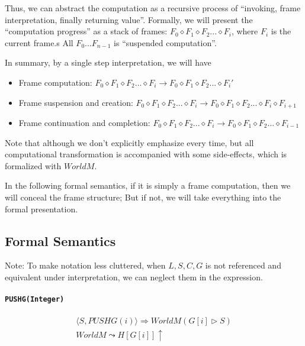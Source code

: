 \documentclass[]{article}
\numberwithin{equation}{section}
\numberwithin{figure}{section}
\numberwithin{table}{section}
\begin{document}
Thus, we can abstract the computation as a recursive process of
``invoking, frame interpretation, finally returning value''. Formally, we will present the ``computation progress'' as a stack
of frames: $F_0 \diamond F_1 \diamond F_2 ... \diamond F_i$, where $F_i$
is the current frame.s All $F_0 ... F_{n - 1}$ is ``suspended
computation''.

In summary, by a single step interpretation, we will have

\begin{itemize}
\itemsep1pt\parskip0pt
\item
  Frame computation:
  $F_0 \diamond F_1 \diamond F_2 ... \diamond F_i \rightarrow F_0 \diamond F_1 \diamond F_2 ... \diamond F_i'$
\item
  Frame suspension and creation:
  $F_0 \diamond F_1 \diamond F_2 ... \diamond F_i \rightarrow F_0 \diamond F_1 \diamond F_2 ... \diamond F_i \diamond F_{i + 1}$
\item
  Frame continuation and completion:
  $F_0 \diamond F_1 \diamond F_2 ... \diamond F_i \rightarrow F_0 \diamond F_1 \diamond F_2 ... \diamond F_{i - 1}$
\end{itemize}

Note that although we don't explicitly emphasize every time,
but all computational transformation is accompanied with some side-effects,
which is formalized with $WorldM$.

In the following formal semantics, if it is simply a frame computation,
then we will conceal the frame structure; But if not, we will take
everything into the formal presentation.

\subsection{Formal Semantics}\label{formal-semantics}

Note: To make notation less cluttered, when $L, S, C, G$ is not referenced
and equivalent under interpretation, we can neglect them in the
expression.

\paragraph{\texttt{PUSHG(Integer)}}\label{pushginteger}

\begin{gather*}
  \langle S, PUSHG(i)\rangle \Rightarrow WorldM (G[i] \rhd S)\\
  WorldM \leadsto H[G[i]] \uparrow
\end{gather*}
\end{document}
